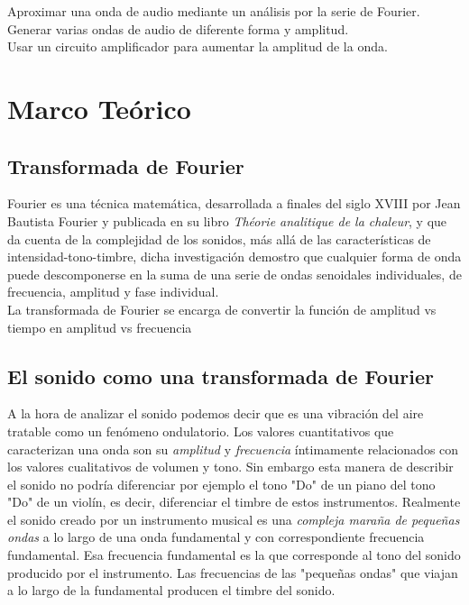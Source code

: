 \documentclass[10pt,a4paper]{book}
\begin{document}
Aproximar una onda de audio mediante un análisis por la serie de Fourier.\\
Generar varias ondas de audio de diferente forma y amplitud.\\
Usar un circuito amplificador para aumentar la amplitud de la onda.\\

\section{Marco Teórico}

\subsection{Transformada de Fourier}

Fourier  es una técnica matemática, desarrollada a finales del siglo XVIII por Jean Bautista Fourier y publicada en su libro \textit{Théorie analitique de la chaleur}, y que da cuenta de la complejidad de los sonidos, más allá de las características de intensidad-tono-timbre, dicha investigación demostro que cualquier forma de onda puede descomponerse en la suma de una serie de ondas senoidales individuales, de frecuencia, amplitud y fase individual. \\
La transformada de Fourier se encarga de convertir la función de amplitud vs tiempo en amplitud vs frecuencia

\subsection{El sonido como una transformada de Fourier}

A la hora de analizar el sonido podemos decir que es una vibración del aire tratable como un fenómeno ondulatorio. Los valores cuantitativos que caracterizan una onda son su \textit{amplitud} y \textit{frecuencia} íntimamente relacionados con los valores cualitativos de volumen y tono. Sin embargo esta manera de describir el sonido no podría diferenciar por ejemplo el tono "Do" de un piano del tono "Do" de un violín, es decir, diferenciar el timbre de estos instrumentos. Realmente el sonido creado por un instrumento musical es una \textit{compleja maraña de pequeñas ondas} a lo largo de una onda fundamental y con correspondiente frecuencia fundamental. Esa frecuencia fundamental es la que corresponde al tono del sonido producido por el instrumento. Las frecuencias de las "pequeñas ondas" que viajan a lo largo de la fundamental producen el timbre del sonido.\\
\end{document}
